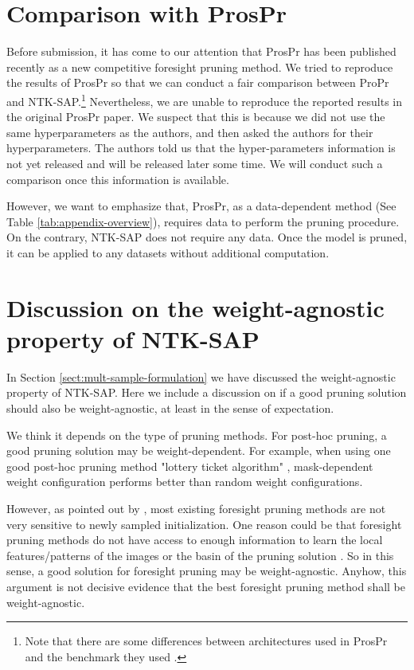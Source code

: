 \documentclass{article} %
\begin{document}
\section{Comparison with ProsPr} \label{sect:compare-prospr}
Before submission, it has come to our attention that ProsPr \citep{alizadeh2022prospect} has been published recently as a new competitive foresight pruning method. We tried to reproduce the results of ProsPr  so that we can conduct a fair comparison between ProPr and NTK-SAP.\footnote{Note that there are some differences between architectures used in ProsPr and the benchmark they used \citep{franklemissing}.} Nevertheless, we are unable to reproduce the reported results in the original ProsPr paper.
We suspect that this is because we did not use the same hyperparameters
as the authors, and then asked the authors for their hyperparameters.
The authors told us that the hyper-parameters information is not yet released and will be released later some time. 
We will conduct such a comparison once this information is available. 


However, we want to emphasize that, ProsPr, as a data-dependent method (See Table \ref{tab:appendix-overview}), requires data to perform the pruning procedure. On the contrary, NTK-SAP does not require any data. Once the model is pruned, it can be applied to any datasets without additional computation.

\section{Discussion on the weight-agnostic property of NTK-SAP} \label{sect:weight-agnostic}

In Section \ref{sect:mult-sample-formulation} we have discussed the weight-agnostic property of NTK-SAP. Here we include a discussion on if a good pruning solution should also be weight-agnostic, at least in the sense of expectation.

We think it depends on the type of pruning methods. For post-hoc pruning, a good pruning solution may be weight-dependent. For example, when using one good post-hoc pruning method "lottery ticket algorithm" \citep{LTH}, mask-dependent weight configuration performs better than random weight configurations. 

However, as pointed out by \citep{franklemissing}, most existing foresight pruning methods are not very sensitive to newly sampled initialization. One reason could be that foresight pruning methods do not have access to enough information to learn the local features/patterns of the images \citep{pellegrini2022neural} or the basin of the pruning solution \citep{evci2022gradient}. So in this sense, a good solution for foresight pruning may be weight-agnostic. Anyhow, this argument is not decisive evidence that the best foresight pruning method shall be weight-agnostic. 
\end{document}
